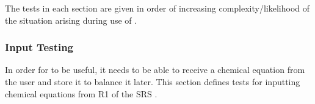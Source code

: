 \documentclass[12pt, titlepage]{article}
\begin{document}
The tests in each section are given in order of increasing complexity/likelihood
of the situation arising during use of \progname{}.


\subsubsection{Input Testing}

In order for \progname{} to be useful, it needs to be able to receive a
chemical equation from the user and store it to balance it later. This
section defines tests for inputting chemical equations from R1 of the SRS
. 
\end{document}
